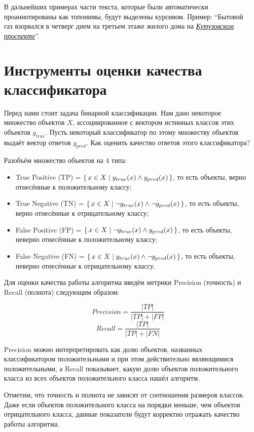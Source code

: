 \documentclass[14pt,russian]{extreport}
\begin{document}
В дальнейших примерах части текста, которые были автоматически проаннотированы
как топонимы, будут выделены курсивом.
Пример: ``Бытовой газ взорвался в четверг днем на третьем этаже жилого дома на
\underline{\it Кутузовском проспекте}''.

\section{Инструменты оценки качества классификатора}

Перед нами стоит задача бинарной классификации. Нам дано некоторое множество
объектов $X$, ассоциированное с вектором истинных классов этих объектов
$y_{true}$. Пусть некоторый классификатор по этому множеству объектов выдаёт
вектор ответов $y_{pred}$. Как оценить качество ответов этого классификатора?

Разобъём множество объектов на 4 типа:

\begin{itemize}
  \item True Positive (TP) = $\set{x \in X | y_{true}(x) \land y_{pred}(x)}$,
    то есть объекты, верно отнесённые к положительному классу;
  \item True Negative (TN) = $\set{x \in X | \neg y_{true}(x) \land \neg
    y_{pred}(x)}$, то есть объекты, верно отнесённые к отрицательному классу;
  \item False Positive (FP) = $\set{x \in X | \neg y_{true}(x) \land
    y_{pred}(x)}$, то есть объекты, неверно отнесённые к положительному классу;
  \item False Negative (FN) = $\set{x \in X | y_{true}(x) \land \neg
    y_{pred}(x)}$, то есть объекты, неверно отнесённые к отрицательному классу.
\end{itemize}

Для оценки качества работы алгоритма введём метрики Precision (точность) и
Recall (полнота) следующим образом:

$$
  Precision=\frac{|TP|}{|TP| + |FP|}
$$
$$
  Recall=\frac{|TP|}{|TP| + |FN|}
$$

Precision можно интерпретировать как долю объектов, названных классификатором
положительными и при этом действительно являющимися положительными, а Recall
показывает, какую долю объектов положительного класса из всех объектов
положительного класса нашёл алгоритм.

Отметим, что точность и полнота не зависят от соотношения размеров классов.
Даже если объектов положительного класса на порядки меньше, чем объектов
отрицательного класса, данные показатели будут корректно отражать качество
работы алгоритма.
\end{document}
